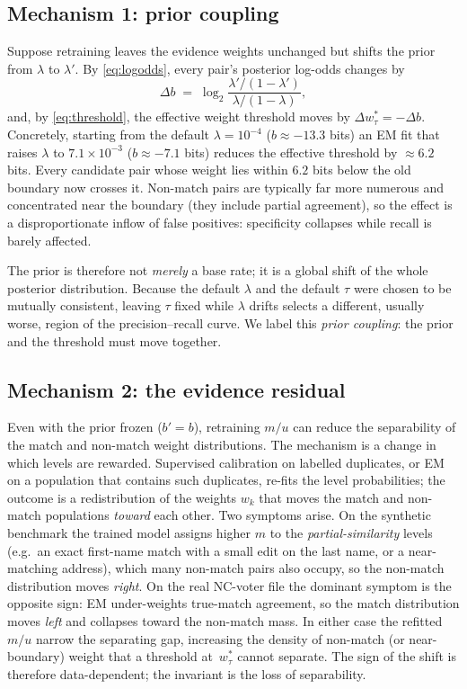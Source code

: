 \documentclass[11pt]{article}
\begin{document}
\subsection{Mechanism 1: prior coupling}
Suppose retraining leaves the evidence weights unchanged but shifts the prior from
$\lambda$ to $\lambda'$. By \eqref{eq:logodds}, every pair's posterior log-odds changes by
\begin{equation}
\Delta b\;=\;\log_2\frac{\lambda'/(1-\lambda')}{\lambda/(1-\lambda)},
\end{equation}
and, by \eqref{eq:threshold}, the effective weight threshold moves by
$\Delta w_\tau^*=-\Delta b$. Concretely, starting from the default
$\lambda=10^{-4}$ ($b\approx-13.3$ bits) an EM fit that raises $\lambda$ to
$7.1\times10^{-3}$ ($b\approx-7.1$ bits) reduces the effective threshold by
$\approx 6.2$ bits. Every candidate pair whose weight lies within $6.2$ bits below the old
boundary now crosses it. Non-match pairs are typically far more numerous and concentrated
near the boundary (they include partial agreement), so the effect is a disproportionate
inflow of false positives: specificity collapses while recall is barely affected.

The prior is therefore not \emph{merely} a base rate; it is a global shift of the whole
posterior distribution. Because the default $\lambda$ and the default $\tau$ were chosen to
be mutually consistent, leaving $\tau$ fixed while $\lambda$ drifts selects a different,
usually worse, region of the precision--recall curve. We label this \emph{prior coupling}:
the prior and the threshold must move together.

\subsection{Mechanism 2: the evidence residual}
Even with the prior frozen ($b'=b$), retraining $m/u$ can reduce the separability of the
match and non-match weight distributions. The mechanism is a change in which levels are
rewarded. Supervised calibration on labelled duplicates, or EM on a population that contains
such duplicates, re-fits the level probabilities; the outcome is a redistribution of the
weights $w_k$ that moves the match and non-match populations \emph{toward} each other. Two
symptoms arise. On the synthetic benchmark the trained model assigns higher $m$ to the
\emph{partial-similarity} levels (e.g.\ an exact first-name match with a small edit on the
last name, or a near-matching address), which many non-match pairs also occupy, so the
non-match distribution moves \emph{right}. On the real NC-voter file the dominant symptom is
the opposite sign: EM under-weights true-match agreement, so the match distribution moves
\emph{left} and collapses toward the non-match mass. In either case the refitted $m/u$ narrow
the separating gap, increasing the density of non-match (or near-boundary) weight that a
threshold at~$w_\tau^*$ cannot separate. The sign of the shift is therefore data-dependent;
the invariant is the loss of separability.
\end{document}
